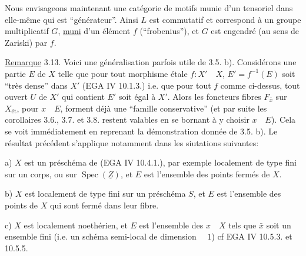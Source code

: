 Nous envisageons maintenant une  catégorie de motifs munie d'un   tensoriel dans elle-même qui est ``générateur''. Ainsi $L$ est commutatif et correspond à un groupe    multiplicatif $G$, \uline{muni} d'un élément $f$ (``frobenius''), et $G$ est engendré (au sens de Zariski) par $f$.  




\uline{Remarque} 3.13. Voici une généralisation parfois utile de 3.5. b). Considérons une partie $E$ de $X$ telle que pour tout morphisme étale $f:X'\quad X$, $E'=f^{-1}(E)$ soit ``très dense'' dans $X'$ (EGA IV 10.1.3.)\unsure{;} i.e. que pour tout $f$ comme ci-dessus, tout ouvert $U$ de $X'$ qui contient $E'$ soit égal à $X'$. Alors les foncteurs fibres $F_{\bar x}$ sur $X_{\text{ét}}$, pour $x\quad E$, forment déjà une ``famille conservative'' (et par suite les corollaires 3.6., 3.7. et 3.8. restent valables en se bornant à y choisir $x\quad E$). Cela se voit immédiatement en reprenant la démonstration donnée de 3.5. b). Le résultat précédent s'applique notamment dans les siutations suivantes:

a) $X$ est un préschéma de  (EGA IV 10.4.1.), par exemple localement de type fini sur un corps, ou sur $\operatorname{Spec}(\underline{Z})$, et $E$ est l'ensemble des points fermés de $X$.

b) $X$ est localement de type fini sur un préschéma $S$, et $E$ est l'ensemble des points de $X$ qui sont fermé dans leur fibre.

c) $X$ est localement noethérien, et $E$ est l'ensemble des $x\quad X$ tels que $\bar x$ soit un ensemble fini (i.e. un schéma semi-local de dimension $\quad 1$) cf EGA IV 10.5.3. et 10.5.5.




